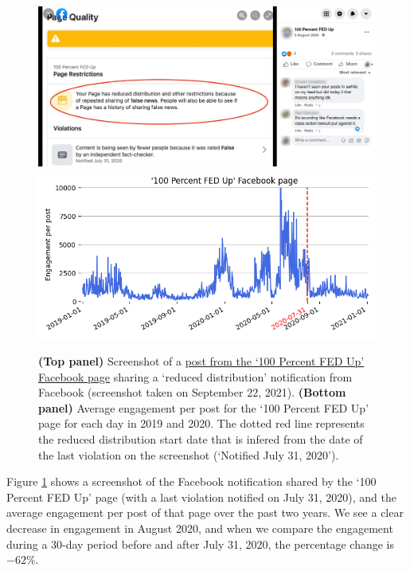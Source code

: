 \documentclass[review]{elsarticle}
\begin{document}
{{\begin{figure}[!h]
\centering
\includegraphics[scale=0.15]{./../figure/reduce_example_screenshot.png}
\includegraphics[scale=0.5]{./../figure/reduce_example_timeseries.png}
\caption{
{\bf(Top panel)} Screenshot of a \href{https://www.facebook.com/100PercentFEDUp/photos/a.330374477016724/3201797096541100}{post from the `100 Percent FED Up' Facebook page} sharing a `reduced distribution' notification from Facebook (screenshot taken on September 22, 2021). 
{\bf(Bottom panel)} Average engagement per post for the `100 Percent FED Up' page for each day in 2019 and 2020.
The dotted red line represents the reduced distribution start date that is infered from the date of the last violation on the screenshot (`Notified July 31, 2020').
}
\label{reduce_example}
\end{figure}

Figure \ref{reduce_example} shows a screenshot of the Facebook notification shared by the `100 Percent FED Up' page (with a last violation notified on July 31, 2020), and the average engagement per post of that page over the past two years. 
We see a clear decrease in engagement in August 2020, and when we compare the engagement during a 30-day period before and after July 31, 2020, the percentage change is $-62\%$.

}}
\end{document}
